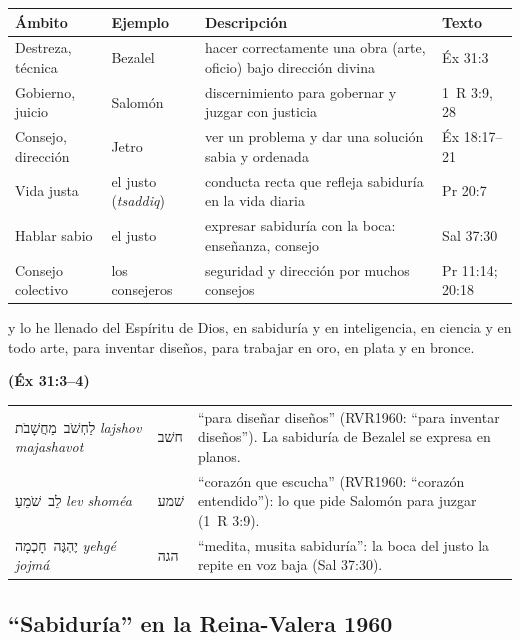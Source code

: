 \documentclass[11pt,letterpaper]{article}
\newcommand{\heb}[1]{\mbox{\foreignlanguage{hebrew}{#1}}}
\newcommand{\fuente}[1]{\par\hfill{\upshape\bfseries\small\textcolor{azul}{#1}}}
\begin{document}
\begin{center}\small\renewcommand{\arraystretch}{1.25}
\begin{tabular}{@{}L{2.4cm}L{2.3cm}L{5.6cm}L{4.1cm}@{}}
\toprule
\textbf{Ámbito} & \textbf{Ejemplo} & \textbf{Descripción} & \textbf{Texto} \\ \midrule
Destreza, técnica & Bezalel & hacer correctamente una obra (arte, oficio) bajo dirección divina & Éx 31:3 \\
Gobierno, juicio & Salomón & discernimiento para gobernar y juzgar con justicia & 1~R 3:9, 28 \\
Consejo, dirección & Jetro & ver un problema y dar una solución sabia y ordenada & Éx 18:17--21 \\
Vida justa & el justo (\emph{tsaddiq}) & conducta recta que refleja sabiduría en la vida diaria & Pr 20:7 \\
Hablar sabio & el justo & expresar sabiduría con la boca: enseñanza, consejo & Sal 37:30 \\
Consejo colectivo & los consejeros & seguridad y dirección por muchos consejos & Pr 11:14; 20:18 \\
\bottomrule
\end{tabular}\end{center}

\begin{cita}y lo he llenado del Espíritu de Dios, en sabiduría y en inteligencia, en ciencia y en todo arte, para inventar diseños, para trabajar en oro, en plata y en bronce.\fuente{(Éx 31:3--4)}\end{cita}

\begin{filologia}[Éx 31:3--4, 1~R 3:9 y Sal 37:30]
\begin{tabular}{@{}L{3.2cm}L{1.6cm}L{10cm}@{}}
\heb{לַחְשֹׁב מַחֲשָׁבֹת} \emph{lajshov majashavot} & \heb{חשׁב} & ``para diseñar diseños'' (RVR1960: ``para inventar diseños''). La sabiduría de Bezalel se expresa en planos. \\[2pt]
\heb{לֵב שֹׁמֵעַ} \emph{lev shoméa} & \heb{שׁמע} & ``corazón que escucha'' (RVR1960: ``corazón entendido''): lo que pide Salomón para juzgar (1~R 3:9). \\[2pt]
\heb{יֶהְגֶּה חָכְמָה} \emph{yehgé jojmá} & \heb{הגה} & ``medita, musita sabiduría'': la boca del justo la repite en voz baja (Sal 37:30). \\
\end{tabular}
\end{filologia}

\subsection{``Sabiduría'' en la Reina-Valera 1960}
\end{document}
